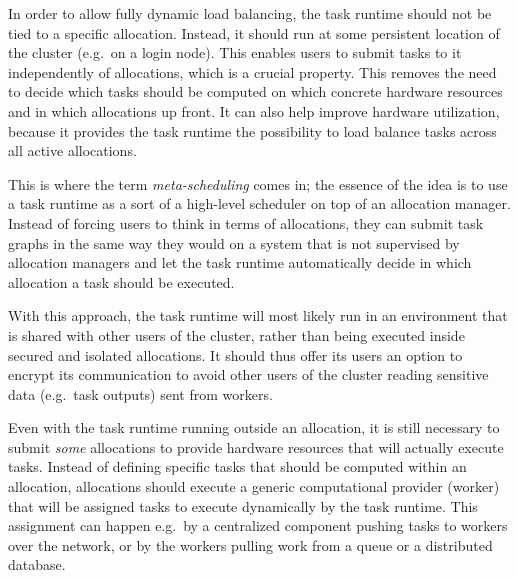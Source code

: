 \begin{description}[wide=0pt]
	\item[Task runtime runs outside of allocations] In order to allow fully dynamic load balancing, the task runtime should not be tied to a specific
		allocation. Instead, it should run at some persistent location of the cluster (e.g.\ on a login
		node). This enables users to submit tasks to it independently of allocations, which is a crucial
		property. This removes the need to decide which tasks should be computed on which concrete hardware
		resources and in which allocations up front. It can also help improve hardware utilization, because
		it provides the task runtime the possibility to load balance tasks across all active allocations.

		This is where the term \emph{meta-scheduling} comes in; the essence of the idea is to use a task
		runtime as a sort of a high-level scheduler on top of an allocation manager. Instead of forcing
		users to think in terms of allocations, they can submit task graphs in the same way they would on a
		system that is not supervised by allocation managers and let the task runtime automatically decide
		in which allocation a task should be executed.

		With this approach, the task runtime will most likely run in an environment that is shared with
		other users of the cluster, rather than being executed inside secured and isolated allocations. It
		should thus offer its users an option to encrypt its communication to avoid other users of the
		cluster reading sensitive data (e.g.\ task outputs) sent from workers.
	\item[Allocations are uniform] Even with the task runtime running outside an allocation, it is still necessary to submit
		\emph{some} allocations to provide hardware resources that will actually execute tasks.
		Instead of defining specific tasks that should be computed within an allocation, allocations should
		execute a generic computational provider (worker) that will be assigned tasks to execute
		dynamically by the task runtime. This assignment can happen e.g.\ by a centralized component
		pushing tasks to workers over the network, or by the workers pulling work from a queue or a
		distributed database.


\end{description}
